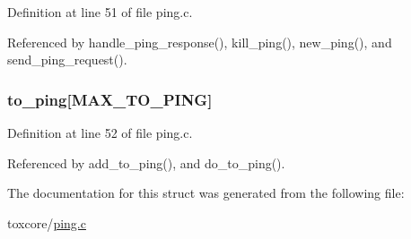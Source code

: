 Definition at line 51 of file ping.\+c.



Referenced by handle\+\_\+ping\+\_\+response(), kill\+\_\+ping(), new\+\_\+ping(), and send\+\_\+ping\+\_\+request().

\hypertarget{struct_p_i_n_g_a285072fd4cc519802afa28bef4227c57}{
\subsubsection[{to\+\_\+ping}]{ to\+\_\+ping\mbox{[}{\bf M\+A\+X\+\_\+\+T\+O\+\_\+\+P\+I\+N\+G}\mbox{]}}}\label{struct_p_i_n_g_a285072fd4cc519802afa28bef4227c57}


Definition at line 52 of file ping.\+c.



Referenced by add\+\_\+to\+\_\+ping(), and do\+\_\+to\+\_\+ping().



The documentation for this struct was generated from the following file\+:\begin{DoxyCompactItemize}
\item 
toxcore/\hyperlink{ping_8c}{ping.\+c}\end{DoxyCompactItemize}
